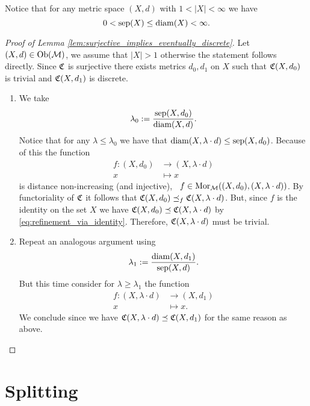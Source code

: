 Notice that for any metric space $(X,d)$ with $1 < |X| < \infty$ we have
$$
0 < \mathrm{sep}(X) \leq \mathrm{diam}(X) < \infty.
$$

\begin{proof}[Proof of Lemma \ref{lem:surjective_implies_eventually_discrete}]
    Let $(X,d) \in \mathrm {Ob}(\mathcal{M})$, we assume that $|X| > 1$ otherwise the statement follows directly. Since $\mathfrak{C}$ is surjective there exists metrics $d_0, d_1$ on $X$ such that $\mathfrak{C}(X,d_0)$ is trivial and $\mathfrak{C}(X,d_1)$ is discrete.

    \begin{enumerate}
        \item We take
        $$
        \lambda_0 := \frac{\mathrm{sep}(X,d_0)}{\mathrm{diam}(X,d)}.
        $$ 
        Notice that for any $\lambda \le \lambda_0$ we have that $\mathrm{diam}(X,\lambda \cdot d) \le \mathrm{sep}(X,d_0)$. Because of this the function
        \begin{align*}
            f: (X, d_0) &\longrightarrow (X, \lambda \cdot d)\\
            x &\longmapsto x
        \end{align*}
        is distance non-increasing (and injective), \ie\ $f \in \mathrm {Mor}_{\mathcal{M}}((X,d_0), (X,\lambda \cdot d))$.
        By functoriality of $\mathfrak{C}$ it follows that $\mathfrak{C}(X,d_0) \preceq_f \mathfrak{C}(X,\lambda \cdot d)$. But, since $f$ is the identity on the set $X$ we have $\mathfrak{C}(X,d_0) \preceq \mathfrak{C}(X,\lambda \cdot d)$ by \eqref{eq:refinement_via_identity}. Therefore, $\mathfrak{C}(X,\lambda \cdot d)$ must be trivial.

        \item Repeat an analogous argument using
        $$
        \lambda_1 := \frac{\mathrm{diam}(X,d_1)}{\mathrm{sep}(X,d)}.
        $$
        But this time consider for $\lambda \ge \lambda_1$ the function
        \begin{align*}
            f: (X, \lambda \cdot d) &\longrightarrow (X, d_1)\\
            x &\longmapsto x.
        \end{align*}
        We conclude since we have $\mathfrak{C}(X,\lambda \cdot d) \preceq \mathfrak{C}(X,d_1)$ for the same reason as above. 
        
    \end{enumerate}
\end{proof}

\section{Splitting}

